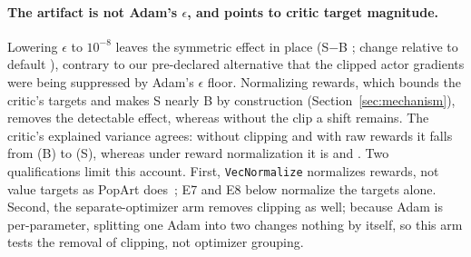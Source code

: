 \paragraph{The artifact is not Adam's $\epsilon$, and points to critic target magnitude.}
Lowering $\epsilon$ to $10^{-8}$ leaves the symmetric effect in place (S$-$B \VfourSymEps{}; change
relative to default \VfourSymEpsChange{}), contrary to our pre-declared alternative that the clipped
actor gradients were being suppressed by Adam's $\epsilon$ floor. Normalizing rewards, which bounds the
critic's targets and makes S nearly B by construction (Section~\ref{sec:mechanism}), removes the detectable effect, whereas without the clip a shift remains. The
critic's explained variance agrees: without clipping and with raw rewards it falls from
\VfourEVSepRawB{} (B) to \VfourEVSepRawS{} (S), whereas under reward normalization it is \VfourEVNormB{}
and \VfourEVNormS{}. Two qualifications limit this account. First, \texttt{VecNormalize} normalizes
rewards, not value targets as PopArt does~\citep{vanhasselt2016popart}; E7 and E8 below normalize the targets
alone. Second, the separate-optimizer
arm removes clipping as well; because Adam is per-parameter, splitting one Adam into two changes nothing
by itself, so this arm tests the removal of clipping, not optimizer grouping.

